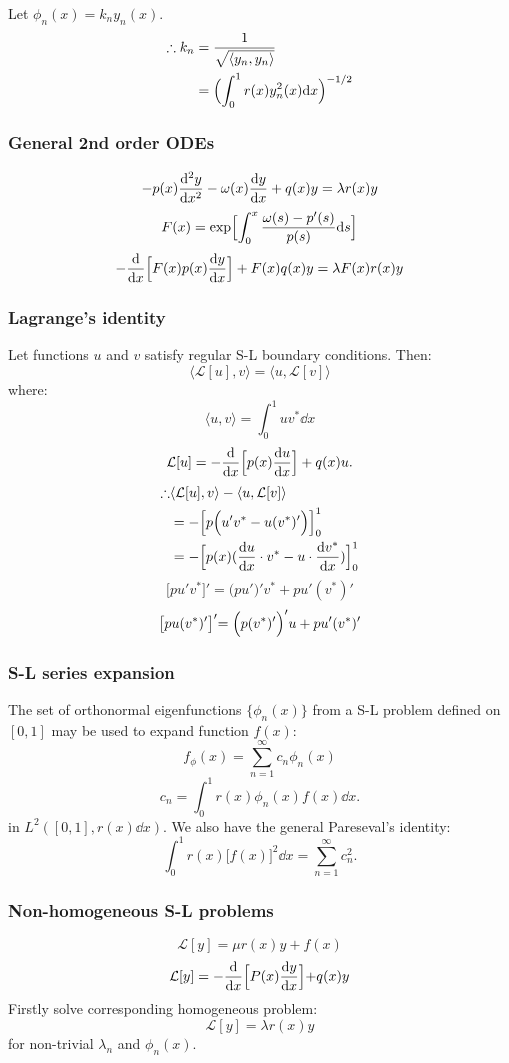 \documentclass{article}
\begin{document}
\begin{multicols}{3}
Let $\phi_n(x)=k_n y_n(x)$.
\begin{align*}
    \therefore k_n
    &=\frac{1}{\sqrt{\langle y_n,y_n \rangle}} \\
    &=\Bigl(\int_{0}^{1}r(x)y_n^2(x)\dd x\Bigr)^{-1/2}
\end{align*}

\subsubsection*{General 2nd order ODEs}
$$-p(x)\dv[2]{y}{x}-\omega(x)\dv{y}{x}+q(x)y=\lambda r(x)y$$
$$F(x)=\exp\Bigl[\int_{0}^{x}
\frac{\omega(s)-p'(s)}{p(s)}\dd s\Bigr]$$
$$-\dv{x}\Bigl[F(x)p(x)\dv{y}{x}\Bigr]
+F(x)q(x)y=\lambda F(x)r(x)y$$

\subsubsection*{Lagrange's identity}
Let functions $u$ and $v$ satisfy regular S-L boundary conditions.
Then:
$$\langle \mathcal{L}[u], v \rangle=\langle u, \mathcal{L}[v] \rangle$$
where:
$$\langle u,v \rangle=\int_{0}^{1}uv^* \dd x$$
$$\mathcal{L}[u]=-\dv{x}\Bigl[p(x)\dv{u}{x}\Bigr]+q(x)u.$$
\begin{align*}
    \therefore&\langle \mathcal{L}[u], v \rangle - \langle u, \mathcal{L}[v] \rangle \\
    &=-\Bigl[p\Bigl(u'v^*-u(v^*)'\Bigl)\Bigl]_{0}^{1} \\
    &=-\Bigl[p(x)(\dv{u}{x}\cdot v^*-u\cdot\dv{v^*}{x})\Bigl]_{0}^{1}
\end{align*}
$$\bigl[pu'v^*\bigl]'=\bigl(pu'\bigl)'v^*+pu'(v^*)'$$
$$\bigl[pu(v^*)'\bigl]'=\Bigl(p(v^*)'\Bigl)'u+pu'(v^*)'$$

\subsubsection*{S-L series expansion}
The set of orthonormal eigenfunctions $\{\phi_n(x)\}$
from a S-L problem defined on $[0,1]$
may be used to expand function $f(x)$:
$$f_\phi(x)=\sum_{n=1}^{\infty} c_n\phi_n(x)$$
$$c_n=\int_{0}^{1}r(x)\phi_n(x)f(x)\dd x.$$
in $L^2([0,1], r(x)\dd x)$.
We also have the general Pareseval's identity:
$$\int_{0}^{1}r(x)\bigl[f(x)\bigr]^2\dd x
=\sum_{n=1}^{\infty}c_n^2.$$

\subsubsection*{Non-homogeneous S-L problems}
$$\mathcal{L}[y]=\mu r(x)y+f(x)$$
$$\mathcal{L}[y]=-\dv{x}\Bigl[P(x)\dv{y}{x}\Bigl]+q(x)y$$
Firstly solve corresponding homogeneous problem:
$$\mathcal{L}[y]=\lambda r(x)y$$
for non-trivial $\lambda_n$ and $\phi_n(x)$.


\end{multicols}
\end{document}

